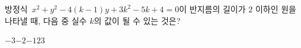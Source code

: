 방정식~$x^2+y^2-4(k-1)y+3k^2-5k+4=0$이 반지름의 길이가 $2$ 이하인 원을 나타낼 때, 다음 중 실수 $k$의 값이 될 수 있는 것은?
\begin{choices32}{$-3$}{$-2$}{$-1$}{$2$}{$3$}\end{choices32}
